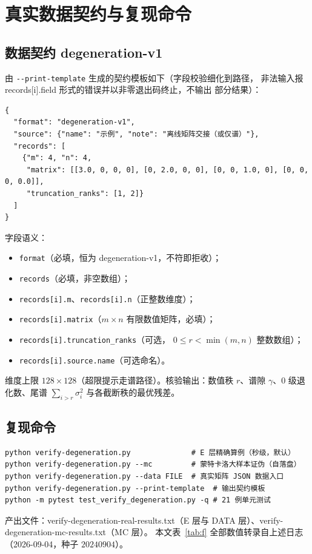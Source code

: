 \documentclass[UTF8,11pt,a4paper]{ctexart}
\theoremstyle{plain}
\theoremstyle{definition}
\theoremstyle{remark}
\begin{document}
\section{真实数据契约与复现命令}\label{app:contract}

\subsection{数据契约 \textsf{degeneration-v1}}

由 \texttt{-{}-print-template} 生成的契约模板如下（字段校验细化到路径，
非法输入报 \textsf{records[i].field} 形式的错误并以非零退出码终止，不输出
部分结果）：

\begin{Verbatim}[fontsize=\scriptsize,frame=single,breaklines=true,breakanywhere=true,breaksymbolleft={}]
{
  "format": "degeneration-v1",
  "source": {"name": "示例", "note": "离线矩阵交接（或仅谱）"},
  "records": [
    {"m": 4, "n": 4,
     "matrix": [[3.0, 0, 0, 0], [0, 2.0, 0, 0], [0, 0, 1.0, 0], [0, 0, 0, 0.0]],
     "truncation_ranks": [1, 2]}
  ]
}
\end{Verbatim}

\noindent 字段语义：
\begin{itemize}\setlength{\itemsep}{2pt}
\item \nolinkurl{format}（必填，恒为 \textsf{degeneration-v1}，不符即拒收）；
\item \nolinkurl{records}（必填，非空数组）；
\item \nolinkurl{records[i].m}、\nolinkurl{records[i].n}（正整数维度）；
\item \nolinkurl{records[i].matrix}（$m\times n$ 有限数值矩阵，必填）；
\item \nolinkurl{records[i].truncation_ranks}（可选，
  $0\le r<\min(m,n)$ 整数数组）；
\item \nolinkurl{records[i].source.name}（可选命名）。
\end{itemize}
维度上限 $128\times128$（超限提示走谱路径）。核验输出：数值秩 $r$、谱隙
$\gamma$、0 级退化数、尾谱 $\sum_{i>r}\sigma_i^2$ 与各截断秩的最优残差。

\subsection{复现命令}

\begin{Verbatim}[fontsize=\scriptsize,frame=single,breaklines=true,breakanywhere=true,breaksymbolleft={}]
python verify-degeneration.py              # E 层精确算例（秒级，默认）
python verify-degeneration.py --mc         # 蒙特卡洛大样本证伪（自落盘）
python verify-degeneration.py --data FILE  # 真实矩阵 JSON 数据入口
python verify-degeneration.py --print-template  # 输出契约模板
python -m pytest test_verify_degeneration.py -q # 21 例单元测试
\end{Verbatim}

\noindent 产出文件：\textsf{verify-degeneration-real-results.txt}（E 层与
DATA 层）、\textsf{verify-degeneration-mc-results.txt}（MC 层）。
本文表~\ref{tab:f} 全部数值转录自上述日志（2026-09-04，种子 $20240904$）。
\end{document}
